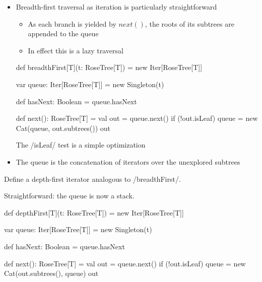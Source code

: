 \documentclass{ip3}
\begin{document}
\begin{foil}
\begin{itemize}
\item Breadth-first traversal as iteration is particularly straightforward
\begin{itemize}
\item As each branch is yielded by $next()$, the roots of its subtrees are appended to the queue
\item In effect this is a lazy traversal
\end{itemize}
\begin{code}

      def breadthFirst[T](t: RoseTree[T]) = new Iter[RoseTree[T]] {
          var queue: Iter[RoseTree[T]] = new Singleton(t)
          
          def hasNext:   Boolean = queue.hasNext
          
          def next():    RoseTree[T] = {
            val out = queue.next()
            if (!out.isLeaf) 
               queue = new Cat(queue, out.subtrees())
            out
          }
      }
\end{code}
\vitem The \sc/isLeaf/ test is a simple optimization
\item The queue is the concatenation of iterators over the unexplored subtrees
\end{itemize}
\begin{exercise}
Define a depth-first iterator analogous to \sc/breadthFirst/.
\begin{answer}
Straightforward: the queue is now a stack.
\begin{-code}
      def depthFirst[T](t: RoseTree[T]) = new Iter[RoseTree[T]] {
          var queue: Iter[RoseTree[T]] = new Singleton(t)
          
          def hasNext:   Boolean = queue.hasNext
          
          def next():    RoseTree[T] = {
            val out = queue.next()
            if (!out.isLeaf) 
               queue = new Cat(out.subtrees(), queue)
            out
          }
      } 
\end{-code}
\end{answer} 
\end{exercise}
\end{foil}
\end{document}
